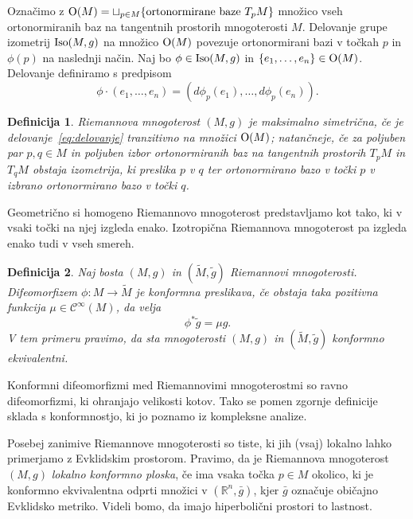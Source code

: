 \documentclass[a4paper]{article}
\newtheorem{definicija}{Definicija}
\begin{document}
Označimo z $\textup{O}(M) = \sqcup_{p \in M} \{ \text{ortonormirane baze} \ T_{p}M \}$ množico vseh ortonormiranih baz na tangentnih prostorih mnogoterosti $M$. Delovanje grupe izometrij $\textup{Iso}(M,g)$ na množico $\textup{O}(M)$ povezuje ortonormirani bazi v točkah $p$ in $\phi(p)$ na naslednji način. Naj bo $\phi \in \textup{Iso}(M,g)$ in $\{e_{1}, \dots , e_{n} \} \in \textup{O}(M)$. Delovanje definiramo s predpisom
\begin{equation}\label{eq:delovanje}
\phi \cdot (e_{1}, \dots , e_{n}) = (d\phi_{p}(e_{1}), \dots , d\phi_{p}(e_{n})).
\end{equation}

\begin{definicija}
Riemannova mnogoterost $(M,g)$ je \emph{maksimalno simetrična}, če je delovanje~\ref{eq:delovanje} tranzitivno na množici $\textup{O}(M)$; natančneje, če za poljuben par $p,q \in M$ in poljuben izbor ortonormiranih baz na tangentnih prostorih $T_{p}M$ in $T_{q}M$ obstaja izometrija, ki preslika $p$ v $q$ ter ortonormirano bazo v točki $p$ v izbrano ortonormirano bazo v točki $q$.
\end{definicija}

Geometrično si homogeno Riemannovo mnogoterost predstavljamo kot tako, ki v vsaki točki na njej izgleda enako.
Izotropična Riemannova mnogoterost pa izgleda enako tudi v vseh smereh.

\begin{definicija}
Naj bosta $(M,g)$ in $(\tilde{M}, \tilde{g})$ Riemannovi mnogoterosti. Difeomorfizem $\phi \colon M \to \tilde{M}$ je \emph{konformna preslikava}, če obstaja taka pozitivna funkcija $\mu \in \mathcal{C}^{\infty}(M)$, da velja
\[ \phi^{*}\tilde{g} = \mu g. \]
V tem primeru pravimo, da sta mnogoterosti $(M,g)$ in $(\tilde{M}, \tilde{g})$ \emph{konformno ekvivalentni}.
\end{definicija}

Konformni difeomorfizmi med Riemannovimi mnogoterostmi so ravno difeomorfizmi, ki ohranjajo velikosti kotov. Tako se pomen zgornje definicije sklada s konformnostjo, ki jo poznamo iz kompleksne analize.

Posebej zanimive Riemannove mnogoterosti so tiste, ki jih (vsaj) lokalno lahko primerjamo z Evklidskim prostorom. Pravimo, da je Riemannova mnogoterost $(M,g)$ \emph{lokalno konformno ploska}, če ima vsaka točka $p\in M$ okolico, ki je konformno ekvivalentna odprti množici v $(\mathbb{R}^{n}, \bar{g})$, kjer $\bar{g}$ označuje običajno Evklidsko metriko. Videli bomo, da imajo hiperbolični prostori to lastnost.
\end{document}
